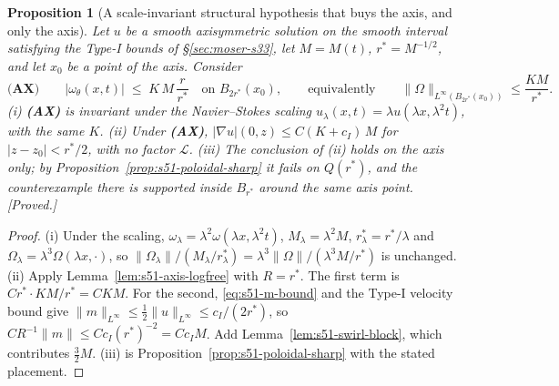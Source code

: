 \documentclass[11pt]{article}
\newtheorem{proposition}[theorem]{Proposition}
\theoremstyle{definition}
\theoremstyle{remark}
\begin{document}
\begin{proposition}[A scale-invariant structural hypothesis that buys the
  axis, and only the axis]\label{prop:s51-ax}
  Let $u$ be a smooth axisymmetric solution on the smooth interval satisfying
  the Type-I bounds of \S\ref{sec:moser-s33}, let $M=M(t)$,
  $r^*=M^{-1/2}$, and let $x_0$ be a point of the axis. Consider
  \[
    \textbf{(AX)}\qquad
    |\omega_\theta(x,t)| \;\leq\; K\,M\,\frac{r}{r^*}
    \quad\text{on } B_{2r^*}(x_0),
    \qquad\text{equivalently}\qquad
    \|\Omega\|_{L^\infty(B_{2r^*}(x_0))}\leq \frac{KM}{r^*} .
  \]
  \textup{(i)} \textbf{(AX)} is invariant under the Navier--Stokes scaling
  $u_\lambda(x,t)=\lambda u(\lambda x,\lambda^2t)$, with the same $K$.
  \textup{(ii)} Under \textbf{(AX)},
  $|\nabla u|(0,z)\leq C(K+c_I)\,M$ for $|z-z_0|<r^*/2$, with no factor
  $\mathcal{L}$.
  \textup{(iii)} The conclusion of \textup{(ii)} holds on the axis only;
  by Proposition~\ref{prop:s51-poloidal-sharp} it fails on
  $Q(r^*)$, and the counterexample there is supported inside $B_{r^*}$
  around the same axis point. \emph{[Proved.]}
\end{proposition}
\begin{proof}
  (i) Under the scaling, $\omega_\lambda=\lambda^2\omega(\lambda x,\lambda^2t)$,
  $M_\lambda=\lambda^2M$, $r^*_\lambda=r^*/\lambda$ and
  $\Omega_\lambda=\lambda^3\Omega(\lambda x,\cdot)$, so
  $\|\Omega_\lambda\|/(M_\lambda/r^*_\lambda)
  =\lambda^3\|\Omega\|/(\lambda^3M/r^*)$ is unchanged.
  (ii) Apply Lemma~\ref{lem:s51-axis-logfree} with $R=r^*$. The first term is
  $Cr^*\cdot KM/r^*=CKM$. For the second, \eqref{eq:s51-m-bound} and the
  Type-I velocity bound give
  $\|m\|_{L^\infty}\leq\tfrac12\|u\|_{L^\infty}\leq c_I/(2r^*)$, so
  $CR^{-1}\|m\|\leq Cc_I(r^*)^{-2}=Cc_IM$. Add
  Lemma~\ref{lem:s51-swirl-block}, which contributes $\tfrac32M$.
  (iii) is Proposition~\ref{prop:s51-poloidal-sharp} with the stated
  placement.
\end{proof}
\end{document}
